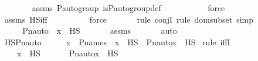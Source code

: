 \begin{isabellebody}
\ \ \ \ \ \ \isamarkupfalse%
\ assms\ {\isasymG}{\isacharunderscore}{\kern0pt}P{\isacharunderscore}{\kern0pt}auto{\isacharunderscore}{\kern0pt}group\ is{\isacharunderscore}{\kern0pt}P{\isacharunderscore}{\kern0pt}auto{\isacharunderscore}{\kern0pt}group{\isacharunderscore}{\kern0pt}def\ \isanewline
\ \ \ \ \ \ \ \ \isamarkupfalse%
\ force\isanewline
\ \ \ \ \ \ \isamarkupfalse%
\ assms{}\ HS{\isacharunderscore}{\kern0pt}iff\ \isanewline
\ \ \ \ \ \ \ \isamarkupfalse%
\ force\isanewline
\ \ \ \ \ \ \isamarkupfalse%
{\isacharparenleft}{\kern0pt}rule\ conjI{\isacharcomma}{\kern0pt}\ rule\ domsubset{\isacharcomma}{\kern0pt}\ simp{\isacharparenright}{\kern0pt}\isanewline
\ \ \ \ \ \ \isamarkupfalse%
\isanewline
\ \ \isamarkupfalse%
\isanewline
\isanewline
\ \ \isamarkupfalse%
\ \isamarkupfalse%
\ {\isachardoublequoteopen}Pn{\isacharunderscore}{\kern0pt}auto{\isacharparenleft}{\kern0pt}{\isasympi}{\isacharparenright}{\kern0pt}\ {\isacharbackquote}{\kern0pt}\ x\ {\isasymin}\ HS{\isachardoublequoteclose}\ \isanewline
\ \ \ \ \isamarkupfalse%
\ assms\ \isanewline
\ \ \ \ \isamarkupfalse%
\ auto\isanewline
{}\isamarkupfalse%
%
\endisatagproof
{\isafoldproof}%
%
\isadelimproof
\isanewline
%
\endisadelimproof
\isanewline
{}\isamarkupfalse%
\ HS{\isacharunderscore}{\kern0pt}Pn{\isacharunderscore}{\kern0pt}auto\ {\isacharcolon}{\kern0pt}\ {\isachardoublequoteopen}{\isasympi}\ {\isasymin}\ {\isasymG}\ {\isasymLongrightarrow}\ x\ {\isasymin}\ P{\isacharunderscore}{\kern0pt}names\ {\isasymLongrightarrow}\ x\ {\isasymin}\ HS\ {\isasymlongleftrightarrow}\ Pn{\isacharunderscore}{\kern0pt}auto{\isacharparenleft}{\kern0pt}{\isasympi}{\isacharparenright}{\kern0pt}{\isacharbackquote}{\kern0pt}x\ {\isasymin}\ HS{\isachardoublequoteclose}\ \isanewline
%
\isadelimproof
%
\endisadelimproof
%
\isatagproof
{}\isamarkupfalse%
{\isacharparenleft}{\kern0pt}rule\ iffI{\isacharparenright}{\kern0pt}\isanewline
\ \ \isamarkupfalse%
\ {\isasympi}\ \isamarkupfalse%
\ {\isachardoublequoteopen}{\isasympi}\ {\isasymin}\ {\isasymG}{\isachardoublequoteclose}\ {\isachardoublequoteopen}x\ {\isasymin}\ HS{\isachardoublequoteclose}\ \isanewline
\ \ \isamarkupfalse%
\ \isamarkupfalse%
\ {\isachardoublequoteopen}Pn{\isacharunderscore}{\kern0pt}auto{\isacharparenleft}{\kern0pt}{\isasympi}{\isacharparenright}{\kern0pt}{\isacharbackquote}{\kern0pt}x\ {\isasymin}\ HS{\isachardoublequoteclose}\ \isanewline

\end{isabellebody}
